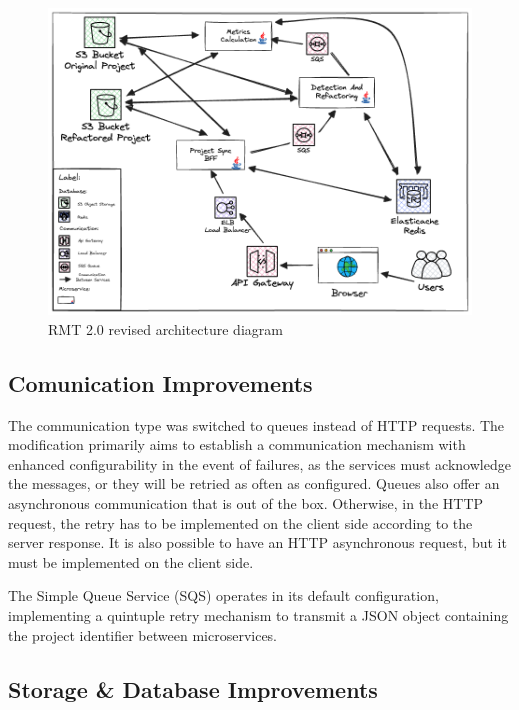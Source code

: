 \begin{figure}[ht!]
\SetCaptionWidth{\textwidth}
\caption{RMT 2.0 revised architecture diagram}
\label{fig-async}
\includegraphics[width =\textwidth, scale=0.2]{Chapter-5/Figures/Async.png}
\end{figure}
\FloatBarrier

\subsection{Comunication Improvements}
\label{sub-comunication}

The communication type was switched to queues instead of HTTP requests. The modification primarily aims to establish a communication mechanism with enhanced configurability in the event of failures, as the services must acknowledge the messages, or they will be retried as often as configured. Queues also offer an asynchronous communication that is out of the box. Otherwise, in the HTTP request, the retry has to be implemented on the client side according to the server response. It is also possible to have an HTTP asynchronous request, but it must be implemented on the client side.

The Simple Queue Service (SQS) operates in its default configuration, implementing a quintuple retry mechanism to transmit a JSON object containing the project identifier between microservices.

\subsection{Storage \& Database Improvements}
\label{sub-storage}

